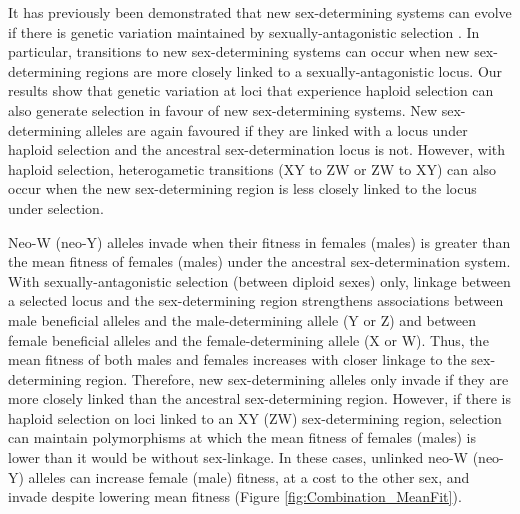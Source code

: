 \documentclass[12pt]{article}
\begin{document}

It has previously been demonstrated that new sex-determining systems can evolve if there is genetic variation maintained by sexually-antagonistic selection \citep{vanDoorn:2007eu,vanDoorn:2010hu}. 
In particular, transitions to new sex-determining systems can occur when new sex-determining regions are more closely linked to a sexually-antagonistic locus.
Our results show that genetic variation at loci that experience haploid selection can also generate selection in favour of new sex-determining systems. 
New sex-determining alleles are again favoured if they are linked with a locus under haploid selection and the ancestral sex-determination locus is not.
However, with haploid selection, heterogametic transitions (XY to ZW or ZW to XY) can also occur when the new sex-determining region is less closely linked to the locus under selection. 

Neo-W (neo-Y) alleles invade when their fitness in females (males) is greater than the mean fitness of females (males) under the ancestral sex-determination system.
With sexually-antagonistic selection (between diploid sexes) only, linkage between a selected locus and the sex-determining region strengthens associations between male beneficial alleles and the male-determining allele (Y or Z) and between female beneficial alleles and the female-determining allele (X or W). 
Thus, the mean fitness of both males and females increases with closer linkage to the sex-determining region. 
Therefore, new sex-determining alleles only invade if they are more closely linked than the ancestral sex-determining region. 
However, if there is haploid selection on loci linked to an XY (ZW) sex-determining region, selection can maintain polymorphisms at which the mean fitness of females (males) is lower than it would be without sex-linkage. 
In these cases, unlinked neo-W (neo-Y) alleles can increase female (male) fitness, at a cost to the other sex, and invade despite lowering mean fitness (Figure \ref{fig:Combination_MeanFit}). 
\end{document}

